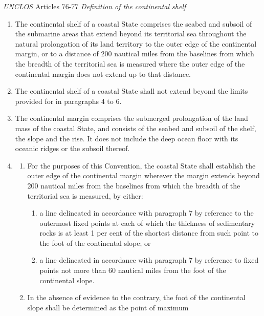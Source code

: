 \begin{conventiondetails}{\textit{UNCLOS} Articles 76-77}
    \flushleft
    \textit{Definition of the continental shelf}

    \begin{enumerate}
        \item The continental shelf of a coastal State comprises the seabed and
        subsoil of the submarine areas that extend beyond its territorial sea
        throughout the natural prolongation of its land territory to the outer edge of
        the continental margin, or to a distance of 200 nautical miles from the
        baselines from which the breadth of the territorial sea is measured where the
        outer edge of the continental margin does not extend up to that distance.
        \item The continental shelf of a coastal State shall not extend beyond the
        limits provided for in paragraphs 4 to 6.
        \item The continental margin comprises the submerged prolongation of the
        land mass of the coastal State, and consists of the seabed and subsoil of the
        shelf, the slope and the rise. It does not include the deep ocean floor with its
        oceanic ridges or the subsoil thereof.
        \item 
        \begin{enumerate}[label=(\alph*)]
            \item For the purposes of this Convention, the coastal State shall establish the outer edge of the continental margin wherever the margin extends beyond 200 nautical miles from the baselines from which the breadth of the territorial sea is measured, by either:
            \begin{enumerate}[label=(\roman*)]
                \item a line delineated in accordance with paragraph 7 by reference to the outermost fixed points at each of which the thickness of sedimentary rocks is at least 1 per cent of the shortest distance from such point to the foot of the continental slope; or
                \item a line delineated in accordance with paragraph 7 by reference to fixed points not more than 60 nautical miles from the foot of the continental slope.
            \end{enumerate}
            \item In the absence of evidence to the contrary, the foot of the
            continental slope shall be determined as the point of maximum

\end{enumerate}
\end{enumerate}
\end{conventiondetails}
